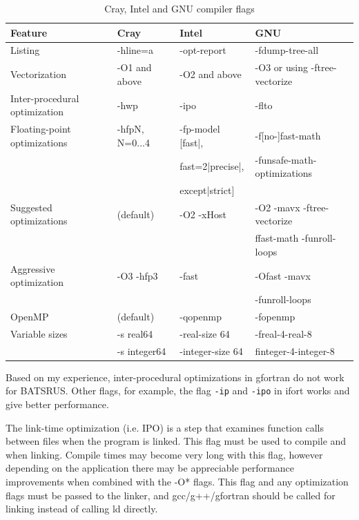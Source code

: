 \documentclass[11pt]{book} %
\begin{document}
\begin{table}[htbp]
  \centering
  \caption{Cray, Intel and GNU compiler flags}
    \begin{tabular}{llll}
    Feature & \multicolumn{1}{l}{Cray} & \multicolumn{1}{l}{Intel} & \multicolumn{1}{l}{GNU} \\
    \hline
    Listing & -hline=a     & -opt-report     & -fdump-tree-all \\
    Vectorization &  -O1 and above      &  -O2 and above   &  -O3 or using -ftree-vectorize  \\
    Inter-procedural optimization & -hwp      & -ipo     & -flto \\
    Floating-point optimizations & -hfpN, N=0...4      & -fp-model [fast|,      & -f[no-]fast-math \\
     & &  fast=2|precise|,   & -funsafe-math-optimizations  \\
     & & except|strict] & \\
    Suggested optimizations & (default)      & -O2 -xHost      & -O2 -mavx -ftree-vectorize  \\
     & & & ffast-math -funroll-loops \\
    Aggressive optimization & -O3 -hfp3     & -fast     & -Ofast -mavx  \\
     & & & -funroll-loops \\
    OpenMP & (default)      & -qopenmp     & -fopenmp \\
    Variable sizes & -s real64 & -real-size 64  &  -freal-4-real-8  \\
     & -s integer64     & -integer-size 64    & finteger-4-integer-8 \\
     \hline
    \end{tabular}%
  \label{tab:compiler_flagl}%
\end{table}%

Based on my experience, inter-procedural optimizations in gfortran do not work for BATSRUS. Other flags, for example, the flag \verb|-ip| and \verb|-ipo| in ifort works and give better performance.

The link-time optimization (i.e. IPO) is a step that examines function calls between files when the program is linked. This flag must be used to compile and when linking. Compile times may become very long with this flag, however depending on the application there may be appreciable performance improvements when combined with the -O* flags.  This flag and any optimization flags must be passed to the linker, and gcc/g++/gfortran should be called for linking instead of calling ld directly.
\end{document}
